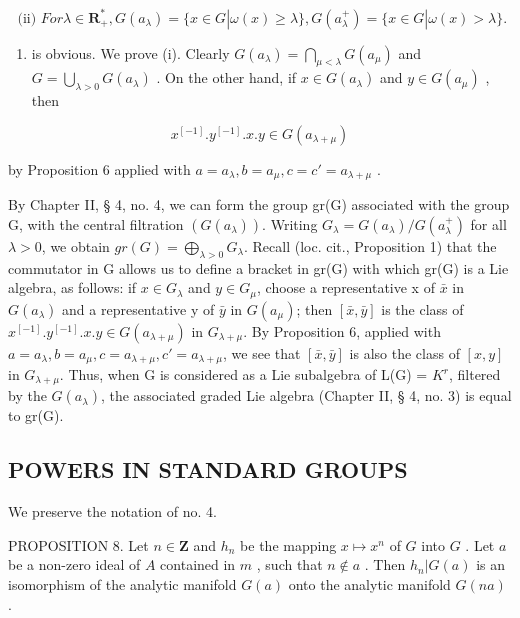 \[
\text { (ii) } For \lambda \in \mathbf {R} _ {+} ^ {*}, G (a _ {\lambda}) = \{x \in G | \omega (x) \geqslant \lambda \}, G (a _ {\lambda} ^ {+}) = \{x \in G | \omega (x) > \lambda \}.
\]

\begin{enumerate}
\def\labelenumi{(\roman{enumi})}
\setcounter{enumi}{1}
\tightlist
\item
  is obvious. We prove (i). Clearly \(G(a_{\lambda}) = \bigcap_{\mu < \lambda} G(a_{\mu})\) and \(G = \bigcup_{\lambda > 0} G(a_{\lambda})\) . On the other hand, if \(x \in G(a_{\lambda})\) and \(y \in G(a_{\mu})\) , then
\end{enumerate}

\[
x ^ {[ - 1 ]}. y ^ {[ - 1 ]}. x. y \in G (a _ {\lambda + \mu})
\]

by Proposition 6 applied with \(a = a_{\lambda}, b = a_{\mu}, c = c' = a_{\lambda + \mu}\) .

By Chapter II, § 4, no. 4, we can form the group gr(G) associated with the group G, with the central filtration \((G(a_\lambda))\). Writing \(G_\lambda = G(a_\lambda)/G(a_\lambda^+)\) for all \(\lambda > 0\), we obtain \(gr(G) = \bigoplus_{\lambda>0} G_\lambda\). Recall (loc. cit., Proposition 1) that the commutator in G allows us to define a bracket in gr(G) with which gr(G) is a Lie algebra, as follows: if \(x \in G_\lambda\) and \(y \in G_\mu\), choose a representative x of \(\bar{x}\) in \(G(a_\lambda)\) and a representative y of \(\bar{y}\) in \(G(a_\mu)\); then \([\bar{x},\bar{y}]\) is the class of \(x^{[-1]}.y^{[-1]}.x.y \in G(a_{\lambda+\mu})\) in \(G_{\lambda+\mu}\). By Proposition 6, applied with \(a = a_\lambda, b = a_\mu, c = a_{\lambda+\mu}, c' = a_{\lambda+\mu}\), we see that \([\bar{x},\bar{y}]\) is also the class of \([x,y]\) in \(G_{\lambda+\mu}\). Thus, when G is considered as a Lie subalgebra of L(G) = \(K^r\), filtered by the \(G(a_\lambda)\), the associated graded Lie algebra (Chapter II, § 4, no. 3) is equal to gr(G).

\subsection{POWERS IN STANDARD GROUPS}

We preserve the notation of no. 4.

PROPOSITION 8. Let \(n \in \mathbf{Z}\) and \(h_n\) be the mapping \(x \mapsto x^n\) of \(G\) into \(G\) . Let \(a\) be a non-zero ideal of \(A\) contained in \(m\) , such that \(n \notin a\) . Then \(h_n|G(a)\) is an isomorphism of the analytic manifold \(G(a)\) onto the analytic manifold \(G(na)\) .

